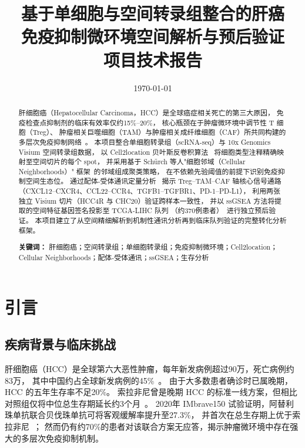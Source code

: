 \documentclass[12pt, a4paper]{ctexart}
\title{
    \vspace{-1cm}
    \textbf{基于单细胞与空间转录组整合的肝癌\\
    免疫抑制微环境空间解析与预后验证}\\[0.5em]
    \large 项目技术报告
}
\author{}
\date{\today}
\begin{document}
\maketitle
\thispagestyle{empty}

\begin{abstract}
肝细胞癌（Hepatocellular Carcinoma，HCC）是全球癌症相关死亡的第三大原因，
免疫检查点抑制剂的临床有效率仅约15\%--20\%，
核心瓶颈在于肿瘤微环境中调节性 T 细胞（Treg）、
肿瘤相关巨噬细胞（TAM）与肿瘤相关成纤维细胞（CAF）所共同构建的多层次免疫抑制网络~\citep{llovet2021hepatocellular,finn2020atezolizumab}。
本项目整合单细胞转录组（scRNA-seq）与 10x Genomics Visium 空间转录组数据，
以 Cell2location 贝叶斯反卷积算法~\citep{kleshchevnikov2022cell2location}
将细胞类型注释精确映射至空间切片的每个 spot，
并采用基于 Schürch 等人"细胞邻域（Cellular Neighborhoods）"
框架~\citep{schurch2020coordinated}的邻域组成聚类策略，
在不依赖先验阈值的前提下识别免疫抑制空间生态位。
通过配体-受体通讯定量分析~\citep{efremova2020cellphonedb}
揭示 Treg--TAM--CAF 轴核心信号通路（CXCL12--CXCR4、CCL22--CCR4、TGFB1--TGFBR1、PD-1--PD-L1），
利用两张独立 Visium 切片（HCC4R 与 CHC20）验证跨样本一致性，
并以 ssGSEA 方法将提取的空间特征基因签名投影至 TCGA-LIHC 队列
（约370例患者）~\citep{tomczak2015cancer}进行独立预后验证。
本项目建立了从空间精细解析到机制性通讯分析再到临床队列验证的完整转化分析框架。

\noindent\textbf{关键词：}
肝细胞癌；空间转录组；单细胞转录组；免疫抑制微环境；Cell2location；
Cellular Neighborhoods；配体-受体通讯；ssGSEA；生存分析
\end{abstract}

\newpage
\tableofcontents
\newpage


\section{引言}

\subsection{疾病背景与临床挑战}

肝细胞癌（HCC）是全球第六大恶性肿瘤，每年新发病例超过90万，死亡病例约83万，
其中中国约占全球新发病例的45\%~\citep{llovet2021hepatocellular,chen2016liver}。
由于大多数患者确诊时已属晚期，HCC 的五年生存率不足20\%。
索拉非尼曾是晚期 HCC 的标准一线方案，但相比对照组仅将中位总生存期延长约3个月~\citep{llovet2008sorafenib}。
2020年 IMbrave150 试验证明，阿替利珠单抗联合贝伐珠单抗可将客观缓解率提升至27.3\%，
并首次在总生存期上优于索拉非尼~\citep{finn2020atezolizumab}；
然而仍有约70\%的患者对该联合方案无应答，揭示肿瘤微环境中存在强大的多层次免疫抑制机制。
\end{document}
